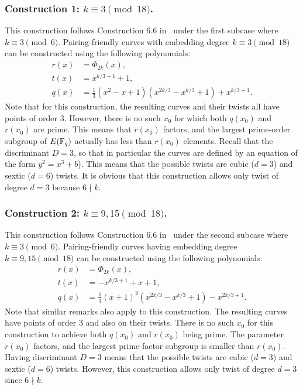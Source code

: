 \subsubsection{Construction 1: $k \equiv 3 \pmod{18}$.}
\label{con1}

This construction follows {Construction 6.6} in~\cite{2010/freeman}
under the first subcase where $k \equiv 3 \pmod{6}$.
Pairing-friendly curves with embedding degree $k \equiv 3 \pmod{18}$
can be constructed using the following polynomials:
\begin{align*}
r(x) &= \Phi_{2k}(x),	\\
t(x) &= x^{k/3+1} + 1,	\\
q(x) &= \frac{1}{3} (x^2 - x + 1) (x^{2k/3} - x^{k/3} + 1) + x^{k/3+1}.
\end{align*}
Note that for this construction,
the resulting curves and their twists all have points of order 3.
However, there is no such $x_0$ for which
both $q(x_0)$ and $r(x_0)$ are prime.
This means that $r(x_0)$ factors, and the largest prime-order subgroup of $E(\mathbb{F}_{q})$ actually has less than $r(x_0)$ elements.
Recall that the discriminant $D = 3$, so that in particular the curves are defined by an equation of the form $y^2 = x^3 + b$).
This means that the possible twists are  cubic ($d=3$) and sextic ($d=6$) twists.
It is obvious that this construction allows only twist of degree $d = 3$ because $6 \nmid k$.


\subsubsection{Construction 2: $k \equiv 9,15 \pmod{18}$.}
\label{con2}

This construction follows {Construction 6.6} in~\cite{2010/freeman}
under the second subcase where $k \equiv 3 \pmod{6}$.
Pairing-friendly curves having embedding degree $k \equiv 9,15 \pmod{18}$
can be constructed using the following polynomials:
\begin{align*}
r(x) &= \Phi_{2k}(x),	\\
t(x) &= -x^{k/3+1} + x + 1,	\\
q(x) &= \frac{1}{3} (x+1)^2 (x^{2k/3} - x^{k/3} + 1) - x^{2k/3+1}.
\end{align*}
Note that similar remarks also apply to this construction.
The resulting curves have points of order 3 and also on their twists.
There is no such $x_0$ for this construction to achieve both $q(x_0)$ and $r(x_0)$ being prime.
The parameter  $r(x_0)$ factors, and the largest prime-factor subgroup is smaller than $r(x_0)$.
Having discriminant $D = 3$
means that the possible twists are  cubic ($d=3$) and sextic ($d=6$) twists.
However, this construction allows only twist of degree $d = 3$ since $6 \nmid k$.

